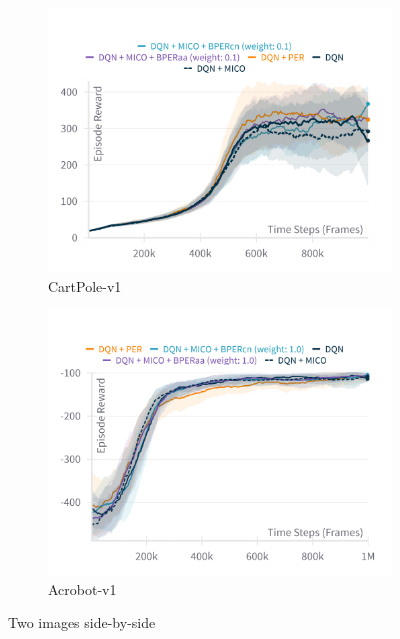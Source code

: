 \begin{figure}[h]
    \hfill
    \begin{subfigure}{0.45\textwidth}
        \includegraphics[width=\linewidth]{Results/general_results/episode_reward_cartpolev1.png}
        \caption{CartPole-v1}
        \label{fig:episode_reward_cartpolev1}
    \end{subfigure}
    \hfill
    \begin{subfigure}{0.45\textwidth}
        \includegraphics[width=\linewidth]{Results/general_results/episode_reward_acrobotv1.png}
        \caption{Acrobot-v1}
        \label{fig:episode_reward_acrobotv1}
    \end{subfigure}
    \caption{Two images side-by-side}
    \label{fig:episode_reward_more_envs}
\end{figure}

